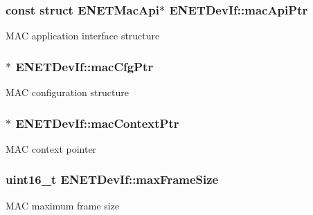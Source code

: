 \subsubsection[{\texorpdfstring{mac\+Api\+Ptr}{macApiPtr}}]{\setlength{\rightskip}{0pt plus 5cm}const struct {\bf E\+N\+E\+T\+Mac\+Api}$\ast$ E\+N\+E\+T\+Dev\+If\+::mac\+Api\+Ptr}\hypertarget{structENETDevIf_aa1cce413d5c8dfc5201968222a773d39}{}\label{structENETDevIf_aa1cce413d5c8dfc5201968222a773d39}
M\+AC application interface structure 
\subsubsection[{\texorpdfstring{mac\+Cfg\+Ptr}{macCfgPtr}}]{$\ast$ E\+N\+E\+T\+Dev\+If\+::mac\+Cfg\+Ptr}\hypertarget{structENETDevIf_a55a61e5adc505a5f3ae4ae7dd995c89f}{}\label{structENETDevIf_a55a61e5adc505a5f3ae4ae7dd995c89f}
M\+AC configuration structure 
\subsubsection[{\texorpdfstring{mac\+Context\+Ptr}{macContextPtr}}]{$\ast$ E\+N\+E\+T\+Dev\+If\+::mac\+Context\+Ptr}\hypertarget{structENETDevIf_ae5122734e4a27b5030eda5e022ab765d}{}\label{structENETDevIf_ae5122734e4a27b5030eda5e022ab765d}
M\+AC context pointer 
\subsubsection[{\texorpdfstring{max\+Frame\+Size}{maxFrameSize}}]{\setlength{\rightskip}{0pt plus 5cm}uint16\+\_\+t E\+N\+E\+T\+Dev\+If\+::max\+Frame\+Size}\hypertarget{structENETDevIf_a4123bfba0f0a0b51273cc798daed3793}{}\label{structENETDevIf_a4123bfba0f0a0b51273cc798daed3793}
M\+AC maximum frame size 
